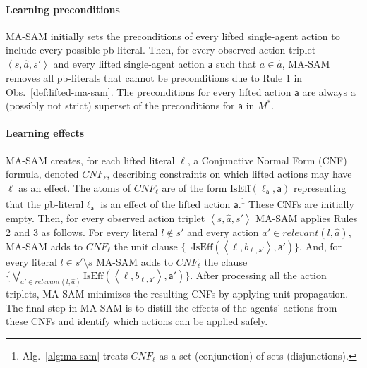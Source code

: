 \documentclass[letterpaper]{article} %
\theoremstyle{definition}
\theoremstyle{remark}
\newcommand{\tuple}[1]{\ensuremath{\left \langle #1 \right \rangle }}
\newcommand{\relevant}{\textit{relevant}}
\newcommand{\cnf}{\textit{CNF}}
\newcommand{\realm}{\ensuremath{M^*}\xspace}
\newcommand{\liftl}{\ensuremath{\ell}}
\newcommand{\lifta}{\mathsf{a}}
\newcommand{\liftatag}{\mathsf{a}'}
\newcommand{\iseff}{\text{IsEff}}
\newcommand{\masam}{\ac{MA-SAM}\xspace}
\newcommand{\pbl}{pb-literal\xspace}
\newcommand{\pbls}{pb-literals\xspace}
\newcommand{\roni}[1]{{\textcolor{red}{[Roni: #1]}}}
\begin{document}
\paragraph{Learning preconditions}
\masam initially sets the preconditions of every lifted single-agent action to include every possible \pbl.
Then, for every observed action triplet $\tuple{s, \hat{a}, s'}$
and every lifted single-agent action $\lifta$ such that $a\in\hat{a}$,
\masam removes all \pbls that cannot be preconditions due to
Rule 1 in Obs.~\ref{def:lifted-ma-sam}.
The preconditions for every lifted action $\lifta$ are  always a (possibly not strict) superset of the preconditions for $\lifta$ in $\realm$.

\paragraph{Learning effects} \masam creates, for each lifted literal $\liftl$, a Conjunctive Normal Form (CNF) formula, denoted $\cnf_{\liftl}$, describing constraints on which lifted actions may have $\liftl$ as an effect.
The atoms of $\cnf_{\liftl}$ are of the form $\iseff(\liftl_\lifta, \lifta)$
representing that the \pbl $\liftl_\lifta$ is an effect of the lifted action $\lifta$.\footnote{Alg.~\ref{alg:ma-sam} treats $\cnf_{\liftl}$ as a set (conjunction) of sets (disjunctions).} %
These CNFs are initially empty.
Then, for every observed action triplet $\tuple{s, \hat{a}, s'}$ \masam applies Rules 2 and 3 as follows.
For every literal $l\notin s'$ and every action $a'\in\relevant(l,\hat{a})$,
\masam adds to $CNF_{\liftl}$ the unit clause $\{\neg\iseff(\tuple{\liftl, b_{\liftl,\liftatag}}, \liftatag)\}$.
And, for every literal $l\in s'\setminus s$
\masam adds to $\cnf_{\liftl}$ the clause
$\{\bigvee_{a'\in \relevant(l,\hat{a})} \iseff(\tuple{\liftl, b_{\liftl,\liftatag}}, \liftatag)\}$.
After processing all the action triplets, \masam minimizes the resulting CNFs by applying unit propagation. %
The final step in \masam is to distill the effects of the agents' actions from these CNFs and identify which actions can be applied safely.
\end{document}
